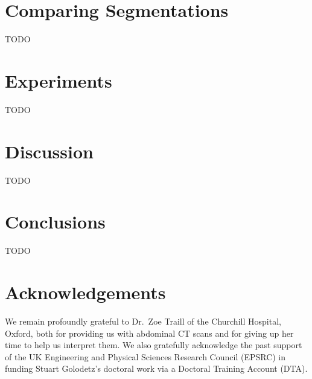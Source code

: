 \documentclass[10pt,twocolumn,twoside]{IEEEtran}
\begin{document}
\section{Comparing Segmentations}
\label{sec:comparisons}

TODO

\section{Experiments}
\label{sec:experiments}

TODO

\section{Discussion}
\label{sec:discussion}

TODO

\section{Conclusions}
\label{sec:conclusions}

TODO

\section{Acknowledgements}

We remain profoundly grateful to Dr.\ Zoe Traill of the Churchill Hospital, Oxford, both for providing us with abdominal CT scans and for giving up her time to help us interpret them. We also gratefully acknowledge the past support of the UK Engineering and Physical Sciences Research Council (EPSRC) in funding Stuart Golodetz's doctoral work via a Doctoral Training Account (DTA).

\clearpage




\vspace{3cm}
\end{document}
